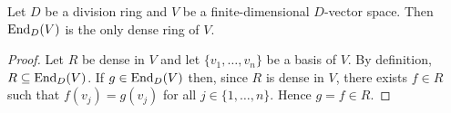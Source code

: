 %
%

\begin{proposition}
	\label{pro:unique_dense}
	Let $D$ be a division ring and 
    $V$ be a finite-dimensional $D$-vector space.  
	Then $\operatorname{End}_D(V)$ is the only dense ring of $V$.
\end{proposition}

\begin{proof}
	Let $R$ be dense in $V$ and let $\{v_1,\dots,v_n\}$ be a basis of $V$. By definition,
	$R\subseteq\operatorname{End}_D(V)$. If $g\in\operatorname{End}_D(V)$ then, since $R$ is dense in $V$, there
	exists $f\in R$ such that $f(v_j)=g(v_j)$ for all 
	$j\in\{1,\dots,n\}$. Hence $g=f\in R$.
\end{proof}


